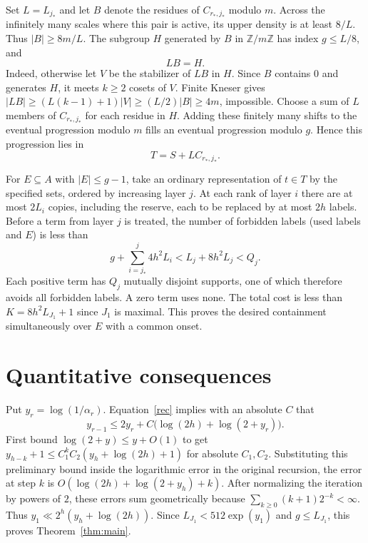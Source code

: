 \documentclass[11pt]{article}
\newcommand{\Z}{\mathbb Z}
\begin{document}
Set $L=L_{j_*}$ and let $B$ denote the residues of $C_{r_*,j_*}$ modulo $m$. Across the infinitely many scales where this pair is active, its upper density is at least $8/L$. Thus $|B|\ge8m/L$. The subgroup $H$ generated by $B$ in $\Z/m\Z$ has index $g\le L/8$, and
\[
 LB=H.
\]
Indeed, otherwise let $V$ be the stabilizer of $LB$ in $H$. Since $B$ contains $0$ and generates $H$, it meets $k\ge2$ cosets of $V$. Finite Kneser gives $|LB|\ge(L(k-1)+1)|V|\ge (L/2)|B|\ge4m$, impossible. Choose a sum of $L$ members of $C_{r_*,j_*}$ for each residue in $H$. Adding these finitely many shifts to the eventual progression modulo $m$ fills an eventual progression modulo $g$. Hence this progression lies in
\[
 T=S+L C_{r_*,j_*}.
\]

For $E\subseteq A$ with $|E|\le g-1$, take an ordinary representation of $t\in T$ by the specified sets, ordered by increasing layer $j$. At each rank of layer $i$ there are at most $2L_i$ copies, including the reserve, each to be replaced by at most $2h$ labels. Before a term from layer $j$ is treated, the number of forbidden labels (used labels and $E$) is less than
\[
 g+\sum_{i=j_*}^{j}4h^2L_i<L_j+8h^2L_j<Q_j .
\]
Each positive term has $Q_j$ mutually disjoint supports, one of which therefore avoids all forbidden labels. A zero term uses none. The total cost is less than $K=8h^2L_{J_1}+1$ since $J_1$ is maximal. This proves the desired containment simultaneously over $E$ with a common onset.

\section{Quantitative consequences}
Put $y_r=\log(1/\alpha_r)$. Equation~\eqref{rec} implies with an absolute $C$ that
\[
 y_{r-1}\le2y_r+C\bigl(\log(2h)+\log(2+y_r)\bigr).
\]
First bound $\log(2+y)\le y+O(1)$ to get $y_{h-k}+1\le C_1^k C_2(y_h+\log(2h)+1)$ for absolute $C_1,C_2$. Substituting this preliminary bound inside the logarithmic error in the original recursion, the error at step $k$ is $O(\log(2h)+\log(2+y_h)+k)$. After normalizing the iteration by powers of $2$, these errors sum geometrically because $\sum_{k\ge0}(k+1)2^{-k}<\infty$. Thus $y_1\ll 2^h(y_h+\log(2h))$. Since $L_{J_1}<512\exp(y_1)$ and $g\le L_{J_1}$, this proves Theorem~\ref{thm:main}.
\end{document}
